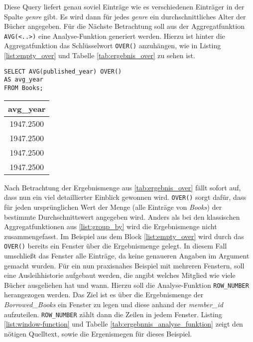 Diese Query liefert genau soviel Einträge wie es verschiedenen Einträger in der
Spalte \textit{genre} gibt. Es wird dann für jedes \textit{genre} ein durchschnittliches
Alter der Bücher angegeben. Für die Nächste Betrachtung soll aus der
Aggregatfunktion \texttt{AVG(<..>)} eine Analyse-Funktion generiert werden.
Hierzu ist hinter die Aggregatfunktion das Schlüsselwort \texttt{OVER()} anzuhängen,
wie in Listing \ref{list:empty_over} und Tabelle \ref{tab:ergebnis_over} zu
sehen ist.

\begin{minipage}{0.60\textwidth}
	\begin{lstlisting}
SELECT AVG(published_year) OVER()
AS avg_year
FROM Books;
	\end{lstlisting}
\end{minipage}
\hfill
\begin{minipage}{0.45\textwidth}
	\centering
	\begin{tabular}{|c|}
		\hline
		\textbf{avg\_year} \\
		\hline
		1947.2500          \\
		\hline
		1947.2500          \\
		\hline
		1947.2500          \\
		\hline
		1947.2500          \\
		\hline
	\end{tabular}
	 \label{tab:ergebnis_over}
\end{minipage}

Nach Betrachtung der Ergebnismenge aus \ref{tab:ergebnis_over} fällt sofort auf,
dass nun ein viel detaillierter Einblick gewonnen wird. \texttt{OVER()} sorgt
dafür, dass für jeden ursprünglichen Wert der Menge (alle Einträge von \textit{Books})
der bestimmte Durchschnittswert angegeben wird. Anders als bei den klassischen Aggregatfunktionen
aus \ref{list:group_by} wird die Ergebnismenge nicht zusammengefasst. Im
Beispiel aus dem Block \ref{list:empty_over} wird durch das \texttt{OVER()} bereits
ein Fenster über die Ergebnismenge gelegt. In diesem Fall umschließt das Fenster
alle Einträge, da keine genaueren Angaben im Argument gemacht wurden. Für ein
nun praxisnahes Beispiel mit mehreren Fenstern, soll eine Ausleihhistorie aufgebaut
werden, die angibt welches Mitglied wie viele Bücher ausgeliehen hat und wann. Hierzu
soll die Analyse-Funktion \texttt{ROW\_NUMBER} herangezogen werden. Das Ziel ist
es über die Ergebnismenge der \textit{Borrowed\_Books} ein Fenster zu legen und
diese anhand der \textit{member\_id} aufzuteilen. \texttt{ROW\_NUMBER} zählt dann
die Zeilen in jedem Fenster. Listing \ref{list:window-function} und Tabelle
\ref{tab:ergebnnis_analyse_funktion} zeigt den nötigen Quelltext, sowie die Ergenismegen
für dieses Beispiel.

